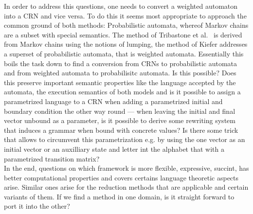 \documentclass[11pt, rgb]{scrartcl}
\begin{document}
In order to address this questions, one needs to convert a weighted automaton into a CRN and vice versa. To do this it seems most appropriate to approach the common ground of both methods: Probabilistic automata, whereof Markov chains are a subset with special semantics. The method of Tribastone et al.~\autocite{Cardelli2017MaximalAO} is derived from Markov chains using the notions of lumping, the method of Kiefer addresses a superset of probabilistic automata, that is weighted automata. Essentially this boils the task down to find a conversion from CRNs to probabilistic automata and from weighted automata to probabilisitc automata. Is this possible? Does this preserve important semantic properties like the language accepted by the automata, the execution semantics of both models and is it possible to assign a parametrized language to a CRN when adding a parametrized initial and boundary condition the other way round --- when leaving the initial and final vector unbound as a parameter, is it possible to derive some rewriting system that induces a grammar when bound with concrete values? Is there some trick that allows to circumvent this parametrization e.g. by using the one vector as an initial vector or an auxilliary state and letter int the alphabet that with a parametrized transition matrix? \\

In the end, questions on which framework is more flexible, expressive, succint, has better computational properties and covers certains language theoretic aspects arise. Similar ones arise for the reduction methods that are applicable and certain variants of them. If we find a method in one domain, is it straight forward to port it into the other?
\end{document}
